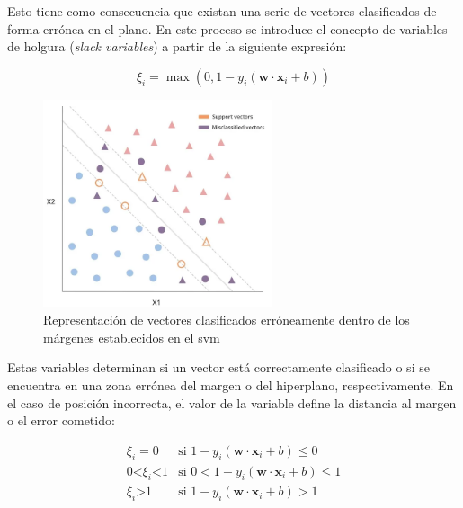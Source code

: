 \vspace{3mm}

Esto tiene como consecuencia que existan una serie de vectores clasificados de forma errónea en el plano. En este proceso se introduce el concepto de variables de holgura (\textit{slack variables}) a partir de la siguiente expresión:

\[ \xi_i = \max(0, 1 - y_i (\mathbf{w} \cdot \mathbf{x}_i + b))\]

\vspace{3mm}

\begin{figure}[h!]
    \centering
    \includegraphics[width=0.6\textwidth]{img/teoria/svm2.png}
    \caption{Representación de vectores clasificados erróneamente dentro de los márgenes establecidos en el \acrshort{svm} \cite{svmmedium}}
    \label{fig:svmerror}
\end{figure}

\vspace{3mm}

Estas variables determinan si un vector está correctamente clasificado o si se encuentra en una zona errónea del margen o del hiperplano, respectivamente. En el caso de posición incorrecta, el valor de la variable define la distancia al margen o el error cometido:

\[\begin{array}{ll}
    \xi_i = 0 & \text{si } 1 - y_i (\mathbf{w} \cdot \mathbf{x}_i + b) \leq 0 \\
    0 \text{<} \xi_i \text{<} 1 & \text{si } 0 < 1 - y_i (\mathbf{w} \cdot \mathbf{x}_i + b) \leq 1 \\
    \xi_i \text{>} 1 & \text{si } 1 - y_i (\mathbf{w} \cdot \mathbf{x}_i + b) > 1 \\
\end{array}\]

